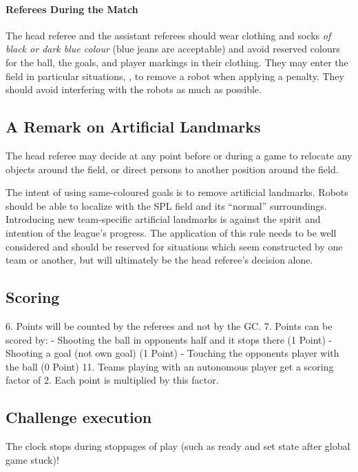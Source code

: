 \paragraph{Referees During the Match}

The head referee and the assistant referees should wear clothing and socks \emph{of black or dark blue colour} (blue jeans are acceptable) and avoid reserved colours for the ball, the goals, and player markings in their clothing. They may enter the field in particular situations, \eg, to remove a robot when applying a penalty. They should avoid interfering with the robots as much as possible.

\subsection{A Remark on Artificial Landmarks}
\label{sec:judgment:landmarks}

The head referee may decide at any point before or during a game to relocate any objects around the field, or direct persons to another position around the field.

The intent of using same-coloured goals is to remove artificial landmarks.
Robots should be able to localize with the SPL field and its ``normal'' surroundings.
Introducing new team-specific artificial landmarks is against the spirit and intention of the league's progress.
The application of this rule needs to be well considered and should be reserved for situations which seem constructed by one team or another, but will ultimately be the head referee's decision alone.

\subsection{Scoring}

6. Points will be counted by the referees and not by the GC.
7. Points can be scored by:
    - Shooting the ball in opponents half and it stops there (1 Point)
    - Shooting a goal (not own goal) (1 Point)
    - Touching the opponents player with the ball (0 Point)
11. Teams playing with an autonomous player get a scoring factor of 2. Each point is multiplied by this factor.

\subsection{Challenge execution}
The clock stops during stoppages of play (such as ready and set state after global game stuck)!

